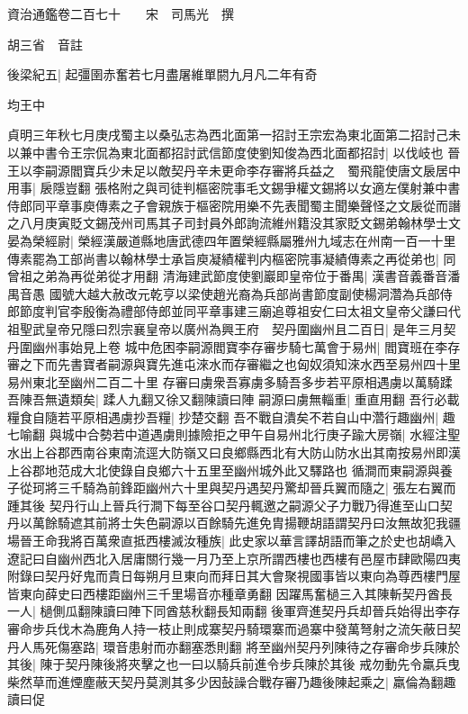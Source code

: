 資治通鑑卷二百七十　　宋　司馬光　撰

胡三省　音註

後梁紀五|{
	起彊圉赤奮若七月盡屠維單閼九月凡二年有奇}


均王中

貞明三年秋七月庚戌蜀主以桑弘志為西北面第一招討王宗宏為東北面第二招討己未以兼中書令王宗侃為東北面都招討武信節度使劉知俊為西北面都招討|{
	以伐岐也}
晉王以李嗣源閻寶兵少未足以敵契丹辛未更命李存審將兵益之　蜀飛龍使唐文扆居中用事|{
	扆隱豈翻}
張格附之與司徒判樞密院事毛文錫爭權文錫將以女適左僕射兼中書侍郎同平章事庾傳素之子會親族于樞密院用樂不先表聞蜀主聞樂聲怪之文扆從而譖之八月庚寅貶文錫茂州司馬其子司封員外郎詢流維州籍没其家貶文錫弟翰林學士文晏為榮經尉|{
	榮經漢嚴道縣地唐武德四年置榮經縣屬雅州九域志在州南一百一十里}
傳素罷為工部尚書以翰林學士承旨庾凝績權判内樞密院事凝績傳素之再從弟也|{
	同曾祖之弟為再從弟從才用翻}
清海建武節度使劉巖即皇帝位于番禺|{
	漢書音義番音潘禺音愚}
國號大越大赦改元乾亨以梁使趙光裔為兵部尚書節度副使楊洞濳為兵部侍郎節度判官李殷衡為禮部侍郎並同平章事建三廟追尊祖安仁曰太祖文皇帝父謙曰代祖聖武皇帝兄隱曰烈宗襄皇帝以廣州為興王府　契丹圍幽州且二百日|{
	是年三月契丹圍幽州事始見上卷}
城中危困李嗣源閻寶李存審步騎七萬會于易州|{
	閻寶班在李存審之下而先書寶者嗣源與寶先進屯淶水而存審繼之也匈奴須知淶水西至易州四十里易州東北至幽州二百二十里}
存審曰虜衆吾寡虜多騎吾多步若平原相遇虜以萬騎蹂吾陳吾無遺類矣|{
	蹂人九翻又徐又翻陳讀曰陣}
嗣源曰虜無輜重|{
	重直用翻}
吾行必載糧食自隨若平原相遇虜抄吾糧|{
	抄楚交翻}
吾不戰自潰矣不若自山中濳行趣幽州|{
	趣七喻翻}
與城中合勢若中道遇虜則據險拒之甲午自易州北行庚子踰大房嶺|{
	水經注聖水出上谷郡西南谷東南流逕大防嶺又曰良鄉縣西北有大防山防水出其南按易州即漢上谷郡地范成大北使錄自良鄉六十五里至幽州城外此又驛路也}
循澗而東嗣源與養子從珂將三千騎為前鋒距幽州六十里與契丹遇契丹驚却晉兵翼而隨之|{
	張左右翼而踵其後}
契丹行山上晉兵行澗下每至谷口契丹輒邀之嗣源父子力戰乃得進至山口契丹以萬餘騎遮其前將士失色嗣源以百餘騎先進免胄揚鞭胡語謂契丹曰汝無故犯我疆場晉王命我將百萬衆直抵西樓滅汝種族|{
	此史家以華言譯胡語而筆之於史也胡嶠入遼記曰自幽州西北入居庸關行幾一月乃至上京所謂西樓也西樓有邑屋市肆歐陽四夷附錄曰契丹好鬼而貴日每朔月旦東向而拜日其大會聚視國事皆以東向為尊西樓門屋皆東向薛史曰西樓距幽州三千里場音亦種章勇翻}
因躍馬奮檛三入其陳斬契丹酋長一人|{
	檛側瓜翻陳讀曰陣下同酋慈秋翻長知兩翻}
後軍齊進契丹兵却晉兵始得出李存審命步兵伐木為鹿角人持一枝止則成寨契丹騎環寨而過寨中發萬弩射之流矢蔽日契丹人馬死傷塞路|{
	環音患射而亦翻塞悉則翻}
將至幽州契丹列陳待之存審命步兵陳於其後|{
	陳于契丹陳後將夾擊之也一曰以騎兵前進令步兵陳於其後}
戒勿動先令羸兵曳柴然草而進煙塵蔽天契丹莫測其多少因鼔譟合戰存審乃趣後陳起乘之|{
	羸倫為翻趣讀曰促}
